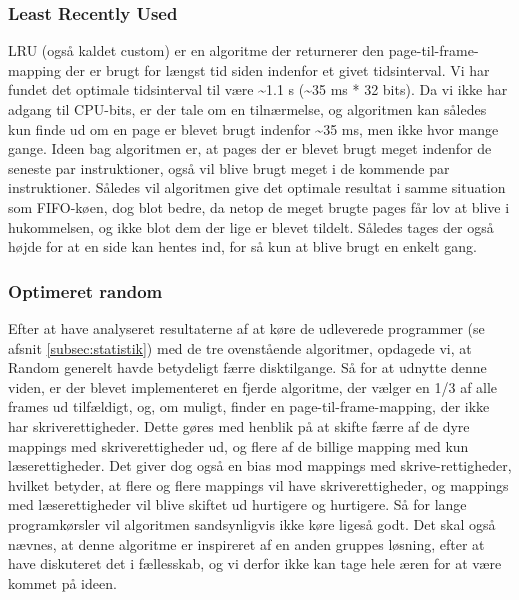 	\subsubsection{Least Recently Used}
	LRU (også kaldet custom) er en algoritme der returnerer den page-til-frame-mapping der er brugt for længst tid siden indenfor et givet tidsinterval.  Vi har fundet det optimale tidsinterval til være \textasciitilde1.1 s (\textasciitilde35 ms * 32 bits). Da vi ikke har adgang til CPU-bits, er der tale om en tilnærmelse, og algoritmen kan således kun finde ud om en page er blevet brugt indenfor \textasciitilde35 ms, men ikke hvor mange gange. Ideen bag algoritmen er, at pages der er blevet brugt meget indenfor de seneste par instruktioner, også vil blive brugt meget i de kommende par instruktioner. Således vil algoritmen give det optimale resultat i samme situation som FIFO-køen, dog blot bedre, da netop de meget brugte pages får lov at blive i hukommelsen, og ikke blot dem der lige er blevet tildelt. Således tages der også højde for at en side kan hentes ind, for så kun at blive brugt en enkelt gang.

	\subsubsection{Optimeret random}
	Efter at have analyseret resultaterne af at køre de udleverede programmer (se afsnit \ref{subsec:statistik}) med de tre ovenstående algoritmer, opdagede vi, at Random generelt havde betydeligt færre disktilgange. Så for at udnytte denne viden, er der blevet implementeret en fjerde algoritme, der vælger en 1/3 af alle frames ud tilfældigt, og, om muligt, finder en page-til-frame-mapping, der ikke har skriverettigheder. Dette gøres med henblik på at skifte færre af de dyre mappings med skriverettigheder ud, og flere af de billige mapping med kun læserettigheder. Det giver dog også en bias mod mappings med skrive-rettigheder, hvilket betyder, at flere og flere mappings vil have skriverettigheder, og mappings med læserettigheder vil blive skiftet ud hurtigere og hurtigere. Så for lange programkørsler vil algoritmen sandsynligvis ikke køre ligeså godt. Det skal også nævnes, at denne algoritme er inspireret af en anden gruppes løsning, efter at have diskuteret det i fællesskab, og vi derfor ikke kan tage hele æren for at være kommet på ideen.
